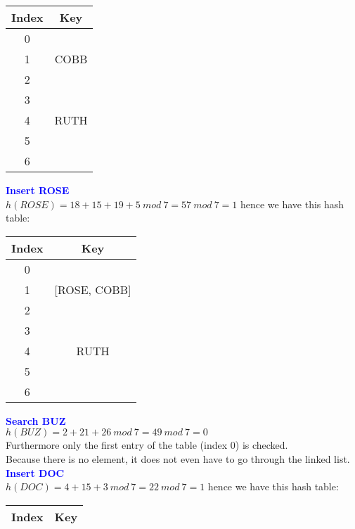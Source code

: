 \documentclass[11pt]{article}
\begin{document}
\begin{enumerate}
\begin{center}
    \begin{tabular}{ | c | c | } 
        \hline
        Index & Key \\ 
        \hline\hline
        0 & \\
        \hline
        1 & COBB\\
        \hline
        2 & \\
        \hline
        3 & \\
        \hline
        4 & RUTH\\
        \hline
        5 & \\
        \hline
        6 & \\
        \hline
    \end{tabular}
    \end{center}
\textbf{\textcolor{blue}{Insert ROSE}}
    \\ $h(ROSE)=18+15+19+5\ mod\ 7 = 57\ mod\ 7 = 1$ hence we have this hash table:
    \begin{center}
    \begin{tabular}{ | c | c | } 
        \hline
        Index & Key \\ 
        \hline\hline
        0 & \\
        \hline
        1 & [ROSE, COBB]\\
        \hline
        2 & \\
        \hline
        3 & \\
        \hline
        4 & RUTH\\
        \hline
        5 & \\
        \hline
        6 & \\
        \hline
    \end{tabular}
    \end{center}
\textbf{\textcolor{blue}{Search BUZ}}
    \\ $h(BUZ)=2+21+26\ mod\ 7 = 49\ mod\ 7 = 0$ 
    \\ Furthermore only the first entry of the table (index $0$) is checked.
    \\ Because there is no element, it does not even have to go through the linked list.
    \\
\textbf{\textcolor{blue}{Insert DOC}}
    \\ $h(DOC)=4+15+3\ mod\ 7 = 22\ mod\ 7 = 1$ hence we have this hash table:
    \begin{center}
    \begin{tabular}{ | c | c | } 
        \hline
        Index & Key \\ 
        \hline\hline

\end{tabular}
\end{center}
\end{enumerate}
\end{document}
